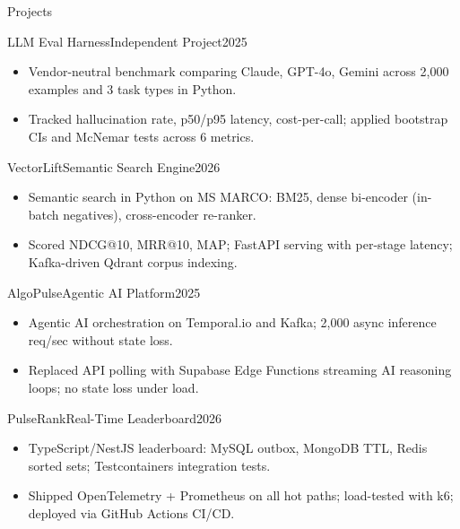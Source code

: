 \documentclass[]{mcdowellcv}
\begin{document}
\begin{cvsection}{Projects}
  \begin{cvsubsection}{LLM Eval Harness}{Independent Project}{2025}
    \begin{itemize}
      \item Vendor-neutral benchmark comparing Claude, GPT-4o, Gemini across 2,000 examples and 3 task types in Python.
      \item Tracked hallucination rate, p50/p95 latency, cost-per-call; applied bootstrap CIs and McNemar tests across 6 metrics.
    \end{itemize}
    \vspace{-1.5pt}
  \end{cvsubsection}

  \begin{cvsubsection}{VectorLift}{Semantic Search Engine}{2026}
    \begin{itemize}
      \item Semantic search in Python on MS MARCO: BM25, dense bi-encoder (in-batch negatives), cross-encoder re-ranker.
      \item Scored NDCG@10, MRR@10, MAP; FastAPI serving with per-stage latency; Kafka-driven Qdrant corpus indexing.
    \end{itemize}
    \vspace{-1.5pt}
  \end{cvsubsection}

  \begin{cvsubsection}{AlgoPulse}{Agentic AI Platform}{2025}
    \begin{itemize}
      \item Agentic AI orchestration on Temporal.io and Kafka; 2,000 async inference req/sec without state loss.
      \item Replaced API polling with Supabase Edge Functions streaming AI reasoning loops; no state loss under load.
    \end{itemize}
    \vspace{-1.5pt}
  \end{cvsubsection}

  \begin{cvsubsection}{PulseRank}{Real-Time Leaderboard}{2026}
    \begin{itemize}
      \item TypeScript/NestJS leaderboard: MySQL outbox, MongoDB TTL, Redis sorted sets; Testcontainers integration tests.
      \item Shipped OpenTelemetry + Prometheus on all hot paths; load-tested with k6; deployed via GitHub Actions CI/CD.
    \end{itemize}
  \end{cvsubsection}
\end{cvsection}
\end{document}
